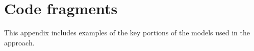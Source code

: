 \documentclass[journal]{IEEEtran}
\begin{document}
\appendices

\section{\tamarin{} Code fragments}
This appendix includes examples of the key portions of the \tamarin{} models used in the approach.




%







\ifCLASSOPTIONcaptionsoff
   \newpage
\fi


\end{document}
